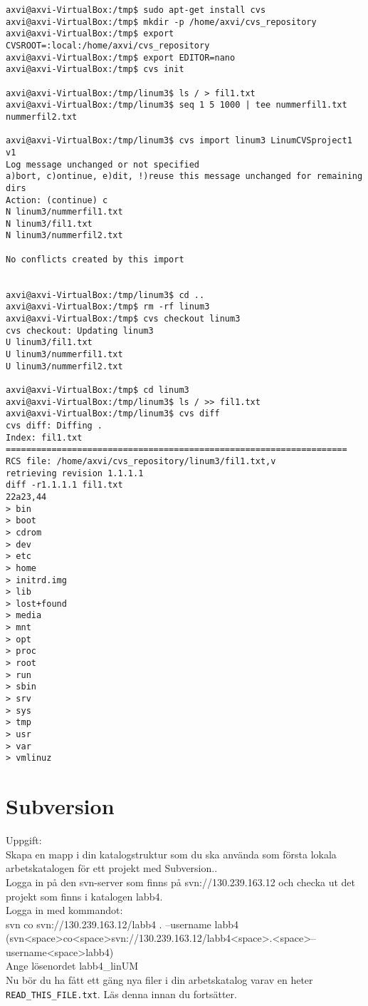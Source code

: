 \documentclass[10pt, a4paper]{article}
\begin{document}
\begin{verbatim}
axvi@axvi-VirtualBox:/tmp$ sudo apt-get install cvs
axvi@axvi-VirtualBox:/tmp$ mkdir -p /home/axvi/cvs_repository
axvi@axvi-VirtualBox:/tmp$ export CVSROOT=:local:/home/axvi/cvs_repository
axvi@axvi-VirtualBox:/tmp$ export EDITOR=nano
axvi@axvi-VirtualBox:/tmp$ cvs init

axvi@axvi-VirtualBox:/tmp/linum3$ ls / > fil1.txt
axvi@axvi-VirtualBox:/tmp/linum3$ seq 1 5 1000 | tee nummerfil1.txt nummerfil2.txt

axvi@axvi-VirtualBox:/tmp/linum3$ cvs import linum3 LinumCVSproject1 v1
Log message unchanged or not specified
a)bort, c)ontinue, e)dit, !)reuse this message unchanged for remaining dirs
Action: (continue) c
N linum3/nummerfil1.txt
N linum3/fil1.txt
N linum3/nummerfil2.txt

No conflicts created by this import


axvi@axvi-VirtualBox:/tmp/linum3$ cd ..
axvi@axvi-VirtualBox:/tmp$ rm -rf linum3
axvi@axvi-VirtualBox:/tmp$ cvs checkout linum3
cvs checkout: Updating linum3
U linum3/fil1.txt
U linum3/nummerfil1.txt
U linum3/nummerfil2.txt

axvi@axvi-VirtualBox:/tmp$ cd linum3
axvi@axvi-VirtualBox:/tmp/linum3$ ls / >> fil1.txt 
axvi@axvi-VirtualBox:/tmp/linum3$ cvs diff
cvs diff: Diffing .
Index: fil1.txt
===================================================================
RCS file: /home/axvi/cvs_repository/linum3/fil1.txt,v
retrieving revision 1.1.1.1
diff -r1.1.1.1 fil1.txt
22a23,44
> bin
> boot
> cdrom
> dev
> etc
> home
> initrd.img
> lib
> lost+found
> media
> mnt
> opt
> proc
> root
> run
> sbin
> srv
> sys
> tmp
> usr
> var
> vmlinuz

\end{verbatim}


\cleardoublepage

\section*{Subversion}\label{sec:svn}

Uppgift:
\\Skapa en mapp i din katalogstruktur som du ska använda som första lokala arbetskatalogen för ett projekt med Subversion..
\\Logga in på den svn-server som finns på svn://130.239.163.12 och checka ut det projekt som finns i katalogen labb4.
\\Logga in med kommandot:
\\svn co svn://130.239.163.12/labb4 . --username labb4
\\(svn<space>co<space>svn://130.239.163.12/labb4<space>.<space>--username<space>labb4)
\\Ange lösenordet labb4\_linUM
\\Nu bör du ha fått ett gäng nya filer i din arbetskatalog varav en heter \verb+READ_THIS_FILE.txt+. Läs denna innan du fortsätter.
\end{document}
